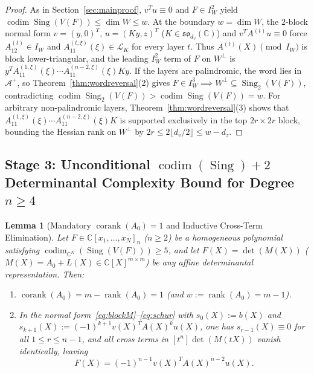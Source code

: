\documentclass[11pt,a4paper]{article}
\newtheorem{lemma}[theorem]{Lemma}
\theoremstyle{definition}
\DeclareMathOperator{\codim}{codim}
\DeclareMathOperator{\Sing}{Sing}
\DeclareMathOperator{\rank}{rank}
\DeclareMathOperator{\corank}{corank}
\begin{document}
\begin{proof}
As in Section~\ref{sec:mainproof}, $v^T u \equiv 0$ and $F \in I_W^2$ yield $\codim\Sing(V(F)) \le \dim W \le w$. At the boundary $w = \dim W$, the $2$-block normal form $v = (y,0)^T$, $u = (Ky,z)^T$ ($K \in \mathfrak{so}_{d_v}(\mathbb{C})$) and $v^T A^{(t)} u \equiv 0$ force $A_{12}^{(t)} \in I_W$ and $A_{11}^{(t,\xi)}(\xi) \in \mathcal{L}_K$ for every layer $t$. Thus $A^{(t)}(X) \pmod{I_W}$ is block lower-triangular, and the leading $I_W^2$ term of $F$ on $W^\perp$ is $y^T A_{11}^{(1,\xi)}(\xi)\cdots A_{11}^{(n-2,\xi)}(\xi) K y$.
If the layers are palindromic, the word lies in $\mathcal{A}^+$, so Theorem~\ref{thm:wordreversal}(2) gives $F \in I_W^3 \implies W^\perp \subseteq \Sing_2(V(F))$, contradicting $\codim\Sing_2(V(F)) > \codim\Sing(V(F)) = w$.
For arbitrary non-palindromic layers, Theorem~\ref{thm:wordreversal}(3) shows that $A_{11}^{(1,\xi)}(\xi)\cdots A_{11}^{(n-2,\xi)}(\xi) K$ is supported exclusively in the top $2r \times 2r$ block, bounding the Hessian rank on $W^\perp$ by $2r \le 2\lfloor d_v/2 \rfloor \le w - d_z$.
\end{proof}

\subsection{Stage 3: Unconditional $\codim(\Sing) + 2$ Determinantal Complexity Bound for Degree $n \ge 4$}

\begin{lemma}[Mandatory $\corank(A_0) = 1$ and Inductive Cross-Term Elimination]\label{lem:generalcorank1}
Let $F \in \mathbb{C}[x_1,\dots,x_N]_n$ ($n \ge 2$) be a homogeneous polynomial satisfying $\codim_{\mathbb{C}^N}(\Sing(V(F))) \ge 5$, and let $F(X) = \det(M(X))$ ($M(X) = A_0 + L(X) \in \mathbb{C}[X]^{m \times m}$) be any affine determinantal representation. Then:
\begin{enumerate}
  \item $\corank(A_0) = m - \rank(A_0) = 1$ (and $w := \rank(A_0) = m - 1$).
  \item In the normal form~\eqref{eq:blockM}--\eqref{eq:schur} with $s_0(X) := b(X)$ and $s_{k+1}(X) := (-1)^{k+1} v(X)^T A(X)^k u(X)$, one has $s_{r-1}(X) \equiv 0$ for all $1 \le r \le n - 1$, and all cross terms in $[t^n]\det(M(tX))$ vanish identically, leaving
  \[
    F(X) = (-1)^{n-1} v(X)^T A(X)^{n-2} u(X).
  \]
\end{enumerate}
\end{lemma}
\end{document}
